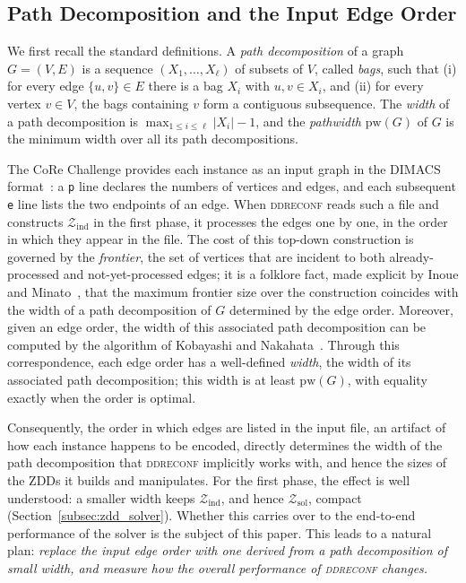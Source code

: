 \documentclass[conference]{IEEEtran}
\newcommand{\zind}{\mathcal{Z}_{\mathrm{ind}}}
\newcommand{\zsol}{\mathcal{Z}_{\mathrm{sol}}}
\begin{document}
\subsection{Path Decomposition and the Input Edge Order}
\label{subsec:pathdecomp}

We first recall the standard definitions.
A \emph{path decomposition} of a graph $G = (V, E)$ is a sequence
$(X_1, \dots, X_\ell)$ of subsets of $V$, called \emph{bags}, such that
(i) for every edge $\{u, v\} \in E$ there is a bag $X_i$ with $u, v \in X_i$, and
(ii) for every vertex $v \in V$, the bags containing $v$ form a contiguous
subsequence. The \emph{width} of a path decomposition is
$\max_{1 \le i \le \ell} |X_i| - 1$, and the \emph{pathwidth} $\mathrm{pw}(G)$ of
$G$ is the minimum width over all its path decompositions.

The CoRe Challenge provides each instance as an input graph in the DIMACS
format~\cite{sotaokit24}: a \texttt{p} line declares the numbers of vertices and
edges, and each subsequent \texttt{e} line lists the two endpoints of an edge.
When \textsc{ddreconf} reads such a file and constructs $\zind$ in the first
phase, it processes the edges one by one, in the order in which they appear in
the file. The cost of this top-down construction is governed by the
\emph{frontier}, the set of vertices that are incident to both already-processed
and not-yet-processed edges; it is a folklore fact, made explicit by Inoue and
Minato~\cite{inoue16}, that the maximum frontier size over the construction
coincides with the width of a path decomposition of $G$ determined by the edge
order. Moreover, given an edge order, the width of this associated path
decomposition can be computed by the algorithm of Kobayashi and
Nakahata~\cite[Lemma~2]{KobayashiNakahata2020}. Through this correspondence, each edge order has a well-defined \emph{width},
the width of its associated path decomposition; this width is at least
$\mathrm{pw}(G)$, with equality exactly when the order is optimal.

Consequently, the order in which edges are listed in the input file, an artifact
of how each instance happens to be encoded, directly determines the width of the
path decomposition that \textsc{ddreconf} implicitly works with, and hence the
sizes of the ZDDs it builds and manipulates. For the first phase, the effect is
well understood: a smaller width keeps $\zind$, and hence $\zsol$, compact
(Section~\ref{subsec:zdd_solver}). Whether this carries over to the end-to-end
performance of the solver is the subject of this paper. This leads to a natural
plan: \emph{replace the input edge order with one derived from a path
decomposition of small width, and measure how the overall performance of
\textsc{ddreconf} changes.}
\end{document}
